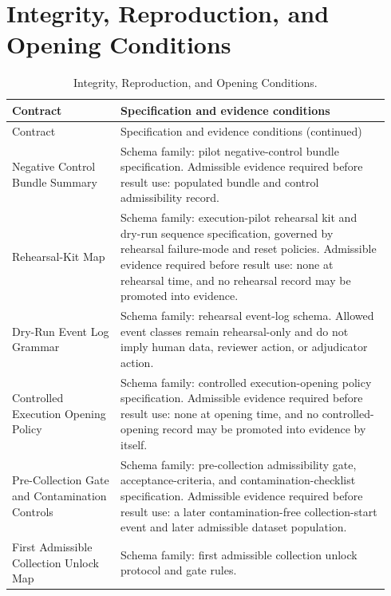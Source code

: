 \documentclass[11pt,a4paper]{article}
\begin{document}
\section{Integrity, Reproduction, and Opening Conditions}\label{app:integrity-controls}
\begingroup\small
\setlength{\tabcolsep}{5pt}
\begin{longtable}{@{}>{\raggedright\arraybackslash}p{0.27\linewidth}p{0.67\linewidth}@{}}
\caption{Integrity, Reproduction, and Opening Conditions.}\\
\toprule Contract & Specification and evidence conditions \\ \midrule
\endfirsthead
\toprule Contract & Specification and evidence conditions (continued) \\ \midrule
\endhead
Negative Control Bundle Summary & Schema family: pilot negative-control bundle specification.\newline 
Admissible evidence required before result use: populated bundle and control
admissibility record. \\ \addlinespace
Rehearsal-Kit Map & Schema family: execution-pilot rehearsal kit and dry-run sequence specification,
governed by rehearsal failure-mode and reset policies.\newline 
Admissible evidence required before result use: none at rehearsal time, and no
rehearsal record may be promoted into evidence. \\ \addlinespace
Dry-Run Event Log Grammar & Schema family: rehearsal event-log schema.\newline 
Allowed event classes remain rehearsal-only and do not imply human data,
reviewer action, or adjudicator action. \\ \addlinespace
Controlled Execution Opening Policy & Schema family: controlled execution-opening policy specification.\newline 
Admissible evidence required before result use: none at opening time, and no
controlled-opening record may be promoted into evidence by itself. \\ \addlinespace
Pre-Collection Gate and Contamination Controls & Schema family: pre-collection admissibility gate, acceptance-criteria, and
contamination-checklist specification.\newline 
Admissible evidence required before result use: a later contamination-free
collection-start event and later admissible dataset population. \\ \addlinespace
First Admissible Collection Unlock Map & Schema family: first admissible collection unlock protocol and gate rules.\newline 

\end{longtable}
\end{document}
